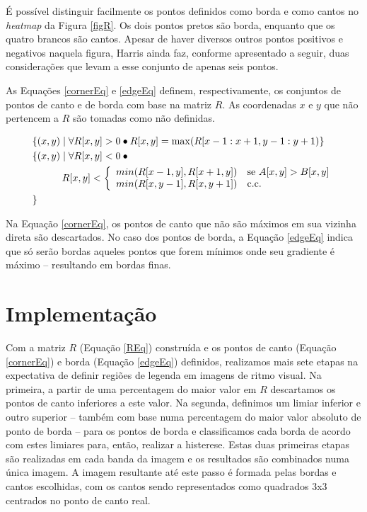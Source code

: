 \documentclass[12pt]{article}
\begin{document}
É possível distinguir facilmente os  pontos definidos como borda e como
cantos no \textit{heatmap} da Figura \ref{figR}. Os dois pontos pretos
são borda, enquanto que os  quatro brancos são cantos. Apesar de haver
diversos outros  pontos positivos  e negativos naquela  figura, Harris
ainda faz, conforme apresentado a seguir, duas considerações que levam
a esse conjunto de apenas seis pontos.

As Equações \ref{cornerEq} e \ref{edgeEq} definem, respectivamente, os
conjuntos de  pontos de canto  e de borda  com base na matriz  $R$. As
coordenadas $x$  e $y$ que  não pertencem a  $R$ são tomadas  como não
definidas.

\begin{align}
  &\{(x, y) \mid \forall R[x,y] > 0 \bullet R[x,y] = \max(R[x-1:x+1,y-1:y+1)\} \label{cornerEq} \\
  &\{
    (x, y) \mid \forall R[x,y] < 0 \bullet \mbox{} \nonumber \\
  & \quad\quad\quad R[x,y] < \left\{
      \begin{array}{l l}
        min(R[x-1,y], R[x+1,y]) & \mbox{se} \,\, A[x,y] > B[x,y]\\
        min(R[x,y-1], R[x,y+1]) & \mbox{c.c.}\\
      \end{array}
    \right. \label{edgeEq} \\
  &\} \nonumber
\end{align}

Na Equação \ref{cornerEq},  os pontos de canto que  não são máximos em
sua vizinha  direta são  descartados. No caso  dos pontos de  borda, a
Equação  \ref{edgeEq} indica que  só serão  bordas aqueles  pontos que
forem  mínimos onde  seu gradiente  é máximo  -- resultando  em bordas
finas.

\section{Implementação}

Com a matriz  $R$ (Equação \ref{REq}) construída e  os pontos de canto
(Equação  \ref{cornerEq}) e  borda  (Equação \ref{edgeEq})  definidos,
realizamos  mais sete  etapas  na expectativa  de  definir regiões  de
legenda  em imagens  de ritmo  visual. Na  primeira, a  partir  de uma
percentagem  do maior  valor em  $R$  descartamos os  pontos de  canto
inferiores a  este valor. Na  segunda, definimos um limiar  inferior e
outro  superior --  também com  base numa  percentagem do  maior valor
absoluto de ponto de borda --  para os pontos de borda e classificamos
cada  borda de  acordo  com  estes limiares  para,  então, realizar  a
histerese.  Estas  duas primeiras etapas são realizadas  em cada banda
da imagem e os resultados  são combinados numa única imagem.  A imagem
resultante até este passo é  formada pelas bordas e cantos escolhidas,
com  os cantos  sendo representados  como quadrados  3x3  centrados no
ponto de canto real.
\end{document}
